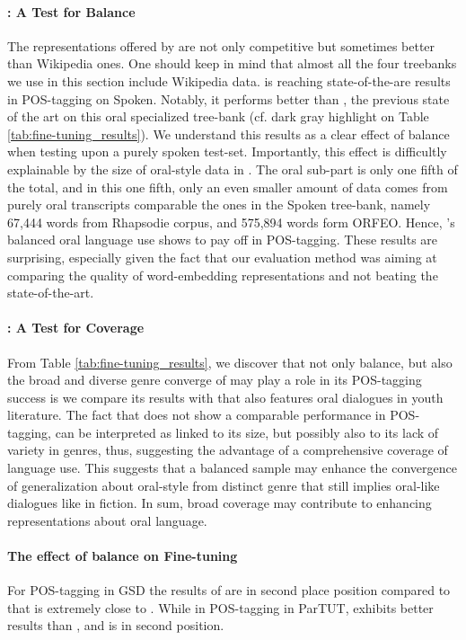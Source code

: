 \paragraph{\ELMococa : A Test for Balance}
The representations offered by \ELMococa are not only competitive but sometimes better than Wikipedia ones. One should keep in mind that almost all the four treebanks we use in this section include Wikipedia data. \ELMococa is reaching state-of-the-are results in POS-tagging on Spoken. Notably, it performs better than \camembert, the previous state of the art on this oral specialized tree-bank (cf. dark gray highlight on Table \ref{tab:fine-tuning_results}). We understand this results as a clear effect of balance when testing upon a purely spoken test-set. Importantly, this effect is difficultly explainable by the size of oral-style data in \Cabernet. The oral sub-part is only one fifth of the total, and in this one fifth, only an even smaller amount of data comes from purely oral transcripts comparable the ones in the Spoken tree-bank, namely 67,444 words from Rhapsodie corpus, and 575,894 words form \textsc{ORFEO}. Hence, \Cabernet's  balanced oral language use shows to pay off in POS-tagging. These results are surprising, especially given the fact that our evaluation method was aiming at comparing the quality of word-embedding representations and not beating the state-of-the-art.

\paragraph{\ELMococa : A Test for Coverage}
From Table \ref{tab:fine-tuning_results}, we discover that not only balance, but also the broad and diverse genre converge of \Cabernet may play a role in its POS-tagging success is we compare its results with \ELMocbt that also features oral dialogues in youth literature. The fact that \ELMocbt does not show a comparable performance in POS-tagging, can be interpreted as linked to its size, but possibly also to its lack of variety in genres, thus, suggesting the advantage of a comprehensive coverage of language use. This suggests that a balanced sample may enhance the convergence of generalization about oral-style from distinct genre that still implies oral-like dialogues like in fiction. In sum, broad coverage may contribute to enhancing representations about oral language.

\paragraph{The effect of balance on Fine-tuning}
For POS-tagging in GSD the results of \ELMooscar are in second place position compared to \ELMocoscar that is extremely close to \ELMowiki. While in POS-tagging in ParTUT, \ELMowiki exhibits better results than \ELMooscar, and \ELMocoscar is in second position.


